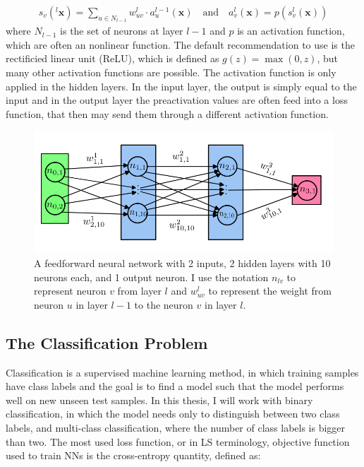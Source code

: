 \begin{align*}
    s_{v}(^l \mathbf{x}) = \sum _{u \in N_{l-1}} w_{uv}^l \cdot a_{u}^{l-1}(\mathbf{x})
    \quad 
    \text{and}
    \quad 
    a_{v}^l(\mathbf{x}) = p(s_{v}^l(\mathbf{x}))
\end{align*}
where $N_{l-1}$ is the set of neurons at layer $l-1$ and $p$ is an activation function, which are often an nonlinear function. The default recommendation to use is the rectificied linear unit (ReLU), which is defined as $g(z) = \max(0, z)$, but many other activation functions are possible. The activation function is only applied in the hidden layers. In the input layer, the output is simply equal to the input and in the output layer the preactivation values are often feed into a loss function, that then may send them through a different activation function. 
\begin{figure}[H]
    \centering
    \includegraphics[width=1\linewidth]{Figures/neural_network.png}
    \caption{A feedforward neural network with 2 inputs, 2 hidden layers with 10 neurons each, and 1 output neuron. I use the notation $n_{lv}$ to represent neuron $v$ from layer $l$ and $w^l_{uv}$ to represent the weight from neuron $u$ in layer $l-1$ to the neuron $v$ in layer $l$.}
    \label{nn}
\end{figure}

\subsection{The Classification Problem}
Classification is a supervised machine learning method, in which training samples have class labels and the goal is to find a model such that the model performs well on new unseen test samples. In this thesis, I will work with binary classification, in which the model needs only to distinguish between two class labels, and multi-class classification, where the number of class labels is bigger than two. The most used loss function, or in LS terminology, objective function used to train NNs is the cross-entropy quantity, defined as:

